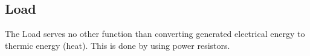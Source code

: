\subsection{Load}
The Load serves no other function than converting generated electrical energy to thermic energy (heat). This is done by using power resistors.